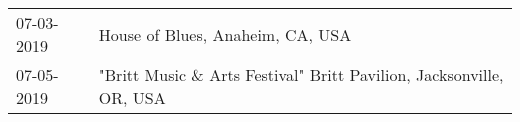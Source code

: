 \begin{supertabular}{ll}
 07-03-2019 &                                     House of Blues, Anaheim, CA, USA \\
 07-05-2019 &  "Britt Music \& Arts Festival" Britt Pavilion, Jacksonville, OR, USA \\
\end{supertabular}
